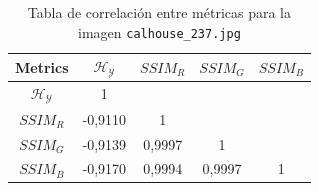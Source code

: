 \begin{table}[H]
\setlength{\abovecaptionskip}{2pt plus 3pt minus 2pt} %
\caption[Parámetros de entrada para $MOPSO$]{Tabla de correlación entre métricas para la imagen \texttt{calhouse\_237.jpg}}
\begin{center}
 \begin{tabular}{||c | c c c c||} 
 \hline
Metrics & $\mathscr{H_Y}$ & $SSIM_R$ & $SSIM_G$ & $SSIM_B$ \\ 
\hline
$\mathscr{H_Y}$ & 1 &  &  & \\ 
\hline
$SSIM_R$ & -0,9110 & 1 &  \\ 
\hline
$SSIM_G$ & -0,9139 & 0,9997  & 1  & \\ 
\hline
$SSIM_B$ & -0,9170 & 0,9994  & 0,9997  & 1 \\ 
\hline
\end{tabular}
\end{center}
\label{table:correlacion}
\end{table}




